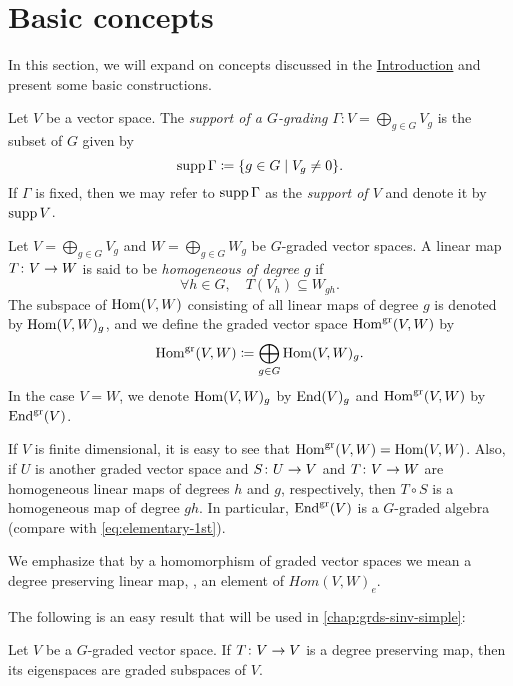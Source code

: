 
\section{Basic concepts}\label{sec:graded-bimodules}

In this section, we will expand on concepts discussed in the \hyperref[chap:intro]{Introduction} and present some basic constructions. 

\label{support}
Let $V$ be a vector space. 
The \emph{support of a $G$-grading} $\Gamma: V = \bigoplus_{g\in G} V_g$ is the subset of $G$ given by
\[
    \operatorname{supp} \Gamma \coloneqq \{ g \in G \mid V_g \neq 0 \}.
\]
If $\Gamma$ is fixed, then we may refer to $\operatorname{supp} \Gamma$ as the \emph{support of $V$} and denote it by $\operatorname{supp} V$. 

\begin{defi}\label{defi:elementary-grd-abstract}
    Let $V = \bigoplus_{g\in G} V_g$ and $W = \bigoplus_{g\in G} W_g$ be $G$-graded vector spaces. 
    A linear map $T \colon V \to W$ is said to be \emph{homogeneous of degree $g$} if 
    \[
    \forall h \in G, \quad T(V_h) \subseteq W_{gh} .
    \]
    The subspace of $\operatorname{Hom}(V,W)$ consisting of all linear maps of degree $g$ is denoted by $\operatorname{Hom} (V, W)_g$, and we define the graded vector space $\operatorname{Hom}^{\textrm{gr}} (V, W)$ by 
    \[
        \operatorname{Hom}^{\textrm{gr}} (V, W) \coloneqq \bigoplus_{g \in G} \operatorname{Hom} (V, W)_g. 
    \]
    In the case $V=W$, we denote $\operatorname{Hom} (V, W)_g$ by $\operatorname{End} (V)_g$ and $\operatorname{Hom}^{\textrm{gr}} (V, W)$ by $\operatorname{End}^{\textrm{gr}} (V)$. 
\end{defi}

If $V$ is finite dimensional, it is easy to see that $\operatorname{Hom}^{\textrm{gr}} (V, W) = \operatorname{Hom} (V, W)$. 
Also, if $U$ is another graded vector space and $S\colon U \to V$ and $T\colon V \to W$ are homogeneous linear maps of degrees $h$ and $g$, respectively, then $T \circ S$ is a homogeneous map of degree $gh$. 
In particular, $\operatorname{End}^{\textrm{gr}} (V)$ is a $G$-graded algebra (compare with \cref{eq:elementary-1st}). 

We emphasize that by a homomorphism of graded vector spaces we mean a degree preserving linear map, \ie, an element of $Hom (V, W)_e$. 

The following is an easy result that will be used in \cref{chap:grds-sinv-simple}:

\begin{lemma}\label{lemma:eigenvector-homogeneous}
	Let $V$ be a $G$-graded vector space. 
	If $T \colon V \to V$ is a degree preserving map, then its eigenspaces are graded subspaces of $V$.
\end{lemma}

